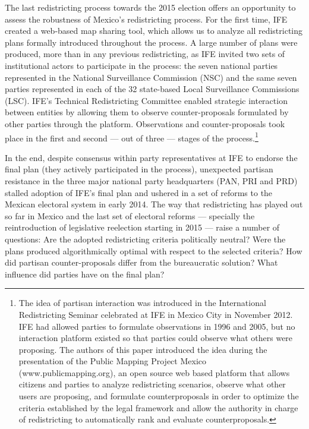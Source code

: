 \documentclass[letter,12pt]{article}
\begin{document}
The last redistricting process towards the 2015 election offers an opportunity to assess the robustness of Mexico's redistricting process. For the first time, IFE created a web-based map sharing tool, which allows us to analyze all redistricting plans formally introduced throughout the process. A large number of plans were produced, more than in any previous redistricting, as IFE invited two sets of institutional actors to participate in the process: the seven national parties represented in the National Surveillance Commission (NSC) and the same seven parties represented in each of the 32 state-based Local Surveillance Commissions (LSC). IFE’s Technical Redistricting Committee enabled strategic interaction between entities by allowing them to observe counter-proposals formulated by other parties through the platform. Observations and counter-proposals took place in the first and second --- out of three --- stages of the process.\footnote{The idea of partisan interaction was introduced in the International Redistricting Seminar celebrated at IFE in Mexico City in November 2012. IFE had allowed parties to formulate observations in 1996 and 2005, but no interaction platform existed so that parties could observe what others were proposing. The authors of this paper introduced the idea during the presentation of the Public Mapping Project Mexico (www.publicmapping.org), an open source web based platform that allows citizens and parties to analyze redistricting scenarios, observe what other users are proposing, and formulate counterproposals in order to optimize the criteria established by the legal framework and allow the authority in charge of redistricting to automatically rank and evaluate counterproposals.} 


In the end, despite consensus within party representatives at IFE to endorse the final plan (they actively participated in the process), unexpected partisan resistance in the three major national party headquarters (PAN, PRI and PRD) stalled adoption of IFE's final plan and ushered in a set of reforms to the Mexican electoral system in early 2014. The way that redistricting has played out so far in Mexico and the last set of electoral reforms --- specially the reintroduction of legislative reelection starting in 2015 --- raise a number of questions: Are the adopted redistricting criteria politically neutral? Were the plans produced algorithmically optimal with respect to the selected criteria? How did partisan counter-proposals differ from the bureaucratic solution? What influence did parties have on the final plan? 
\end{document}
